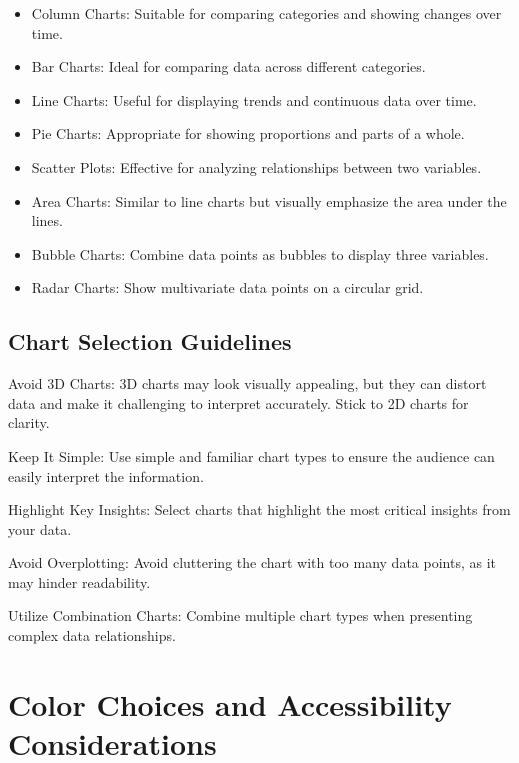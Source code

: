 \documentclass[
]{book}
\providecommand{\tightlist}{%
  \setlength{\itemsep}{0pt}\setlength{\parskip}{0pt}}
\begin{document}
\begin{itemize}
\tightlist
\item
  Column Charts: Suitable for comparing categories and showing changes over time.
\item
  Bar Charts: Ideal for comparing data across different categories.
\item
  Line Charts: Useful for displaying trends and continuous data over time.
\item
  Pie Charts: Appropriate for showing proportions and parts of a whole.
\item
  Scatter Plots: Effective for analyzing relationships between two variables.
\item
  Area Charts: Similar to line charts but visually emphasize the area under the lines.
\item
  Bubble Charts: Combine data points as bubbles to display three variables.
\item
  Radar Charts: Show multivariate data points on a circular grid.
\end{itemize}

\hypertarget{chart-selection-guidelines}{%
\subsection{Chart Selection Guidelines}\label{chart-selection-guidelines}}

Avoid 3D Charts: 3D charts may look visually appealing, but they can distort data and make it challenging to interpret accurately. Stick to 2D charts for clarity.

Keep It Simple: Use simple and familiar chart types to ensure the audience can easily interpret the information.

Highlight Key Insights: Select charts that highlight the most critical insights from your data.

Avoid Overplotting: Avoid cluttering the chart with too many data points, as it may hinder readability.

Utilize Combination Charts: Combine multiple chart types when presenting complex data relationships.

\hypertarget{color-choices-and-accessibility-considerations}{%
\section{Color Choices and Accessibility Considerations}\label{color-choices-and-accessibility-considerations}}
\end{document}
